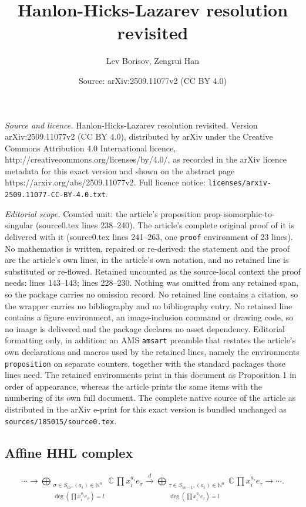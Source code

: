 \documentclass[10pt,a4paper]{amsart}
\title{Hanlon-Hicks-Lazarev resolution revisited}
\author{Lev Borisov, Zengrui Han}
\date{Source: arXiv:2509.11077v2 (CC BY 4.0)}
\def\C {{\mathbb C}}
\begin{document}
\maketitle

\noindent\emph{Source and licence.} Hanlon-Hicks-Lazarev resolution revisited. Version arXiv:2509.11077v2 (CC BY 4.0), distributed by arXiv under the Creative Commons Attribution 4.0 International licence, http://creativecommons.org/licenses/by/4.0/, as recorded in the arXiv licence metadata for this exact version and shown on the abstract page https://arxiv.org/abs/2509.11077v2. Full licence notice: \texttt{licenses/arxiv-2509.11077-CC-BY-4.0.txt}.\par\smallskip

\noindent\textit{Editorial scope.} Counted unit: the article's proposition prop-isomorphic-to-singular (source0.tex lines 238--240). The article's complete original proof of it is delivered with it (source0.tex lines 241--263, one \texttt{proof} environment of 23 lines). No mathematics is written, repaired or re-derived: the statement and the proof are the article's own lines, in the article's own notation, and no retained line is substituted or re-flowed.  Retained uncounted as the source-local context the proof needs: lines 143--143; lines 228--230.  Nothing was omitted from any retained span, so the package carries no omission record.  No retained line contains a citation, so the wrapper carries no bibliography and no bibliography entry.  No retained line contains a figure environment, an image-inclusion command or drawing code, so no image is delivered and the package declares no asset dependency.  Editorial formatting only, in addition: an AMS \texttt{amsart} preamble that restates the article's own declarations and macros used by the retained lines, namely the environments \texttt{proposition} on separate counters, together with the standard packages those lines need.  The retained environments print in this document as Proposition 1 in order of appearance, whereas the article prints the same items with the numbering of its own full document.  The complete native source of the article as distributed in the arXiv e-print for this exact version is bundled unchanged as \texttt{sources/185015/source0.tex}.
\subsection{Affine HHL complex}\label{subsec-affine-HHL}

\begin{align}\label{eq-l-complex}
    \cdots\rightarrow\bigoplus_{\substack{ \sigma\in S_m, (a_i)\in\mathbb{N}^n \\ \deg(\prod x_i^{a_i} e_{\sigma}) = l}} \C \, \prod x_i^{a_i} e_{\sigma} \xrightarrow{d} \bigoplus_{\substack{ \tau\in S_{m-1}, (a_i)\in\mathbb{N}^n\\ \deg(\prod x_i^{a_i} e_{\tau}) = l}} \C \, \prod x_i^{a_i} e_{\tau}\rightarrow\cdots.
\end{align}
\end{document}

